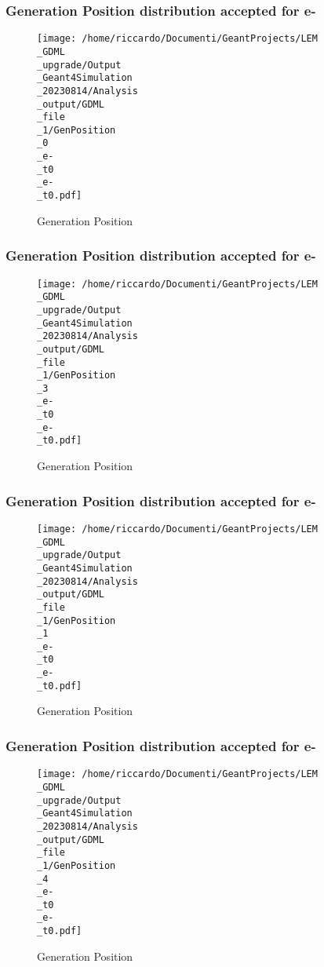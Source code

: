 \documentclass[8pt]{beamer}
\begin{document}
            \begin{frame}
                \frametitle{Generation Position distribution accepted for e-}
            
        \begin{figure}[h]
            \centering
            \texttt{[image: /home/riccardo/Documenti/GeantProjects/LEM\\\_GDML\\\_upgrade/Output\\\_Geant4Simulation\\\_20230814/Analysis\\\_output/GDML\\\_file\\\_1/GenPosition\\\_0\\\_e-\\\_t0\\\_e-\\\_t0.pdf]}
            \caption{Generation Position}
        \end{figure}
        
            \end{frame}
            
            \begin{frame}
                \frametitle{Generation Position distribution accepted for e-}
            
        \begin{figure}[h]
            \centering
            \texttt{[image: /home/riccardo/Documenti/GeantProjects/LEM\\\_GDML\\\_upgrade/Output\\\_Geant4Simulation\\\_20230814/Analysis\\\_output/GDML\\\_file\\\_1/GenPosition\\\_3\\\_e-\\\_t0\\\_e-\\\_t0.pdf]}
            \caption{Generation Position}
        \end{figure}
        
            \end{frame}
            
            \begin{frame}
                \frametitle{Generation Position distribution accepted for e-}
            
        \begin{figure}[h]
            \centering
            \texttt{[image: /home/riccardo/Documenti/GeantProjects/LEM\\\_GDML\\\_upgrade/Output\\\_Geant4Simulation\\\_20230814/Analysis\\\_output/GDML\\\_file\\\_1/GenPosition\\\_1\\\_e-\\\_t0\\\_e-\\\_t0.pdf]}
            \caption{Generation Position}
        \end{figure}
        
            \end{frame}
            
            \begin{frame}
                \frametitle{Generation Position distribution accepted for e-}
            
        \begin{figure}[h]
            \centering
            \texttt{[image: /home/riccardo/Documenti/GeantProjects/LEM\\\_GDML\\\_upgrade/Output\\\_Geant4Simulation\\\_20230814/Analysis\\\_output/GDML\\\_file\\\_1/GenPosition\\\_4\\\_e-\\\_t0\\\_e-\\\_t0.pdf]}
            \caption{Generation Position}
        \end{figure}
        
            \end{frame}
            
\end{document}
